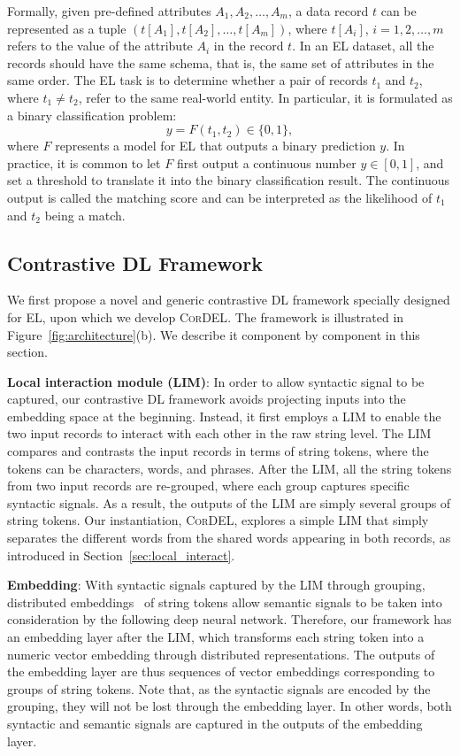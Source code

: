 \documentclass[conference]{IEEEtran}
\begin{document}
Formally, given pre-defined attributes $A_1, A_2, \ldots, A_m$, a data record $t$ can be represented as a tuple $(t[A_1], t[A_2], \ldots, t[A_m])$, where $t[A_i]$, $i=1,2,\ldots,m$ refers to the value of the attribute $A_i$ in the record $t$. In an EL dataset, all the records should have the same schema, that is, the same set of attributes in the same order. The EL task is to determine whether a pair of records $t_1$ and $t_2$, where $t_1 \neq t_2$, refer to the same real-world entity. In particular, it is formulated as a binary classification problem:
\begin{equation}
    y = F(t_1, t_2) \in \{0,1\},
\end{equation}
where $F$ represents a model for EL that outputs a binary prediction $y$. In practice, it is common to let $F$ first output a continuous number $y \in [0,1]$, and set a threshold to translate it into the binary classification result. The continuous output is called the matching score and can be interpreted as the likelihood of $t_1$ and $t_2$ being a match.

\subsection{Contrastive DL Framework}\label{sec:framework}

We first propose a novel and generic contrastive DL framework specially designed for EL, upon which we develop \textsc{CorDEL}. The framework is illustrated in Figure~\ref{fig:architecture}(b). We describe it component by component in this section.

\textbf{Local interaction module (LIM)}: In order to allow syntactic signal to be captured, our contrastive DL framework avoids projecting inputs into the embedding space at the beginning. Instead, it first employs a LIM to enable the two input records to interact with each other in the raw string level. The LIM compares and contrasts the input records in terms of string tokens, where the tokens can be characters, words, and phrases. After the LIM, all the string tokens from two input records are re-grouped, where each group captures specific syntactic signals. As a result, the outputs of the LIM are simply several groups of string tokens. Our instantiation, \textsc{CorDEL}, explores a simple LIM that simply separates the different words from the shared words appearing in both records, as introduced in Section~\ref{sec:local_interact}.

\textbf{Embedding}: With syntactic signals captured by the LIM through grouping, distributed embeddings~\cite{mikolov2013distributed,pennington2014glove,bojanowski2017enriching,joulin2017bag} of string tokens allow semantic signals to be taken into consideration by the following deep neural network. Therefore, our framework has an embedding layer after the LIM, which transforms each string token into a numeric vector embedding through distributed representations. The outputs of the embedding layer are thus sequences of vector embeddings corresponding to groups of string tokens. Note that, as the syntactic signals are encoded by the grouping, they will not be lost through the embedding layer. In other words, both syntactic and semantic signals are captured in the outputs of the embedding layer.
\end{document}
